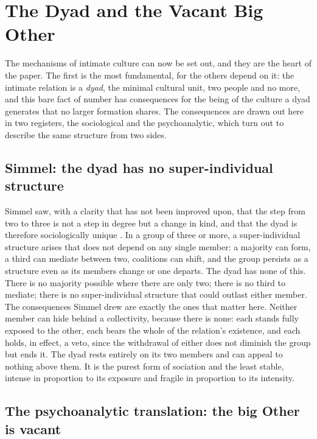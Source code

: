 \section{The Dyad and the Vacant Big Other}
\label{p24:sec:dyad}

\noindent
The mechanisms of intimate culture can now be set out, and they are the heart of the paper. The first is the most fundamental, for the others depend on it: the intimate relation is a \emph{dyad}, the minimal cultural unit, two people and no more, and this bare fact of number has consequences for the being of the culture a dyad generates that no larger formation shares. The consequences are drawn out here in two registers, the sociological and the psychoanalytic, which turn out to describe the same structure from two sides.

\subsection*{Simmel: the dyad has no super-individual structure}

Simmel saw, with a clarity that has not been improved upon, that the step from two to three is not a step in degree but a change in kind, and that the dyad is therefore sociologically unique \parencite{simmel1950}. In a group of three or more, a super-individual structure arises that does not depend on any single member: a majority can form, a third can mediate between two, coalitions can shift, and the group persists as a structure even as its members change or one departs. The dyad has none of this. There is no majority possible where there are only two; there is no third to mediate; there is no super-individual structure that could outlast either member. The consequences Simmel drew are exactly the ones that matter here. Neither member can hide behind a collectivity, because there is none: each stands fully exposed to the other, each bears the whole of the relation's existence, and each holds, in effect, a veto, since the withdrawal of either does not diminish the group but ends it. The dyad rests entirely on its two members and can appeal to nothing above them. It is the purest form of sociation and the least stable, intense in proportion to its exposure and fragile in proportion to its intensity.

\subsection*{The psychoanalytic translation: the big Other is vacant}

